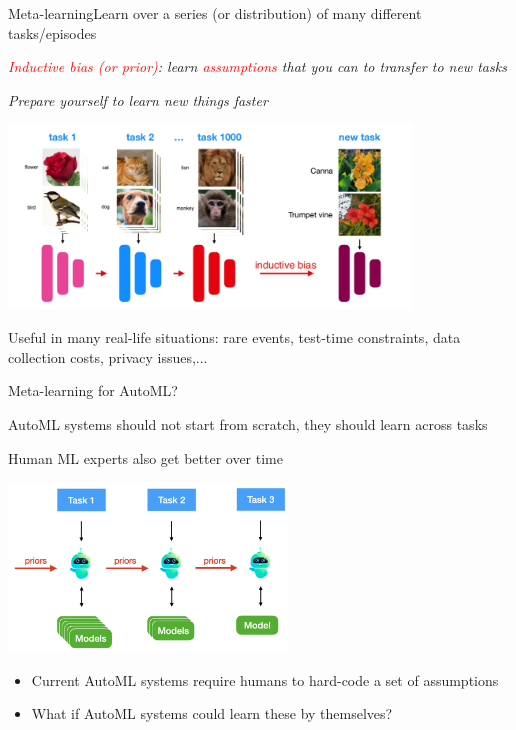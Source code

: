 \begin{frame}{Meta-learning}{Learn over a series (or distribution) of many different tasks/episodes}
  \centerline{\textit{\textcolor{red}{Inductive bias (or prior)}: learn \textcolor{red}{assumptions} that you can to transfer to new tasks}}
  \centerline{\textit{Prepare yourself to learn new things faster}}
  \centering\includegraphics[height=4.9cm]{image/img182859.jpg}
  
  \leavevmode\hphantom{ }
  
  \small\centerline{Useful in many real-life situations: rare events, test-time constraints, data collection costs, privacy issues,...}
  \end{frame}
  

\begin{frame}{Meta-learning for AutoML?}
  \centerline{AutoML systems should not start from scratch, they should learn across tasks}
  \centerline{Human ML experts also get better over time}

  \centering\includegraphics[height=4.5cm]{image/imgnew1.png}
  
  \begin{itemize}
    \item Current AutoML systems require humans to hard-code a set of assumptions
    \item What if AutoML systems could learn these by themselves?
  \end{itemize}

\end{frame}

